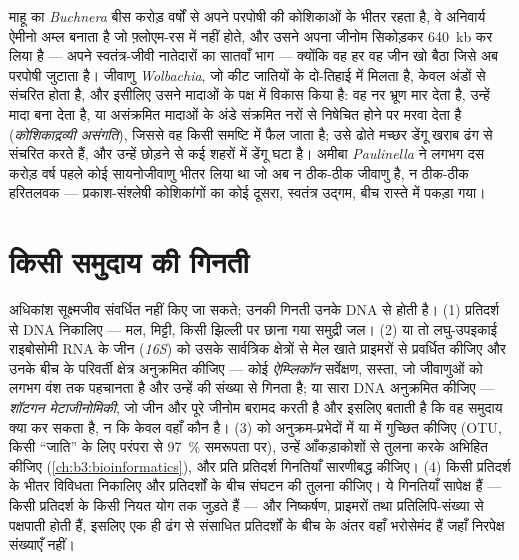 \begin{example}[तीन अनिवार्य साथी]\label{ex:b3:microbiomes:obligate}
माहू का \emph{Buchnera} बीस करोड़ वर्षों से अपने परपोषी की कोशिकाओं के
भीतर रहता है, वे अनिवार्य ऐमीनो अम्ल बनाता है जो फ़्लोएम-रस में नहीं
होते, और उसने अपना जीनोम सिकोड़कर \qty{640}{kb} कर लिया है --- अपने
स्वतंत्र-जीवी नातेदारों का सातवाँ भाग --- क्योंकि वह हर वह जीन खो
बैठा जिसे अब परपोषी जुटाता है। जीवाणु \emph{Wolbachia}, जो कीट जातियों
के दो-तिहाई में मिलता है, केवल अंडों से संचरित होता है, और इसीलिए उसने
मादाओं के पक्ष में विकास किया है: वह नर भ्रूण मार देता है, उन्हें मादा
बना देता है, या असंक्रमित मादाओं के अंडे संक्रमित नरों से निषेचित होने
पर मरवा देता है (\emph{कोशिकाद्रव्यी असंगति}), जिससे वह किसी समष्टि में
फैल जाता है; उसे ढोते मच्छर डेंगू खराब ढंग से संचरित करते हैं, और
उन्हें छोड़ने से कई शहरों में डेंगू घटा है। अमीबा \emph{Paulinella} ने
लगभग दस करोड़ वर्ष पहले कोई सायनोजीवाणु भीतर लिया था जो अब न ठीक-ठीक
जीवाणु है, न ठीक-ठीक हरितलवक --- प्रकाश-संश्लेषी कोशिकांगों का कोई
दूसरा, स्वतंत्र उद्गम, बीच रास्ते में पकड़ा गया।
\end{example}

\section{किसी समुदाय की गिनती}

\begin{method}[अनुक्रमण से किसी माइक्रोबायोम का लक्षण-चित्र]\label{met:b3:microbiomes:16s}
अधिकांश सूक्ष्मजीव संवर्धित नहीं किए जा सकते; उनकी गिनती उनके DNA से
होती है। (1) प्रतिदर्श से DNA निकालिए --- मल, मिट्टी, किसी झिल्ली पर
छाना गया समुद्री जल। (2) या तो लघु-उपइकाई राइबोसोमी RNA के जीन
(\emph{16S}) को उसके सार्वत्रिक क्षेत्रों से मेल खाते प्राइमरों से
प्रवर्धित कीजिए और उनके बीच के परिवर्ती क्षेत्र अनुक्रमित कीजिए ---
कोई \emph{ऐम्प्लिकॉन} सर्वेक्षण, सस्ता, जो जीवाणुओं को लगभग वंश तक
पहचानता है और उन्हें  की संख्या से गिनता है; या सारा DNA
अनुक्रमित कीजिए --- \emph{शॉटगन मेटाजीनोमिकी}, जो जीन और पूरे जीनोम
बरामद करती है और इसलिए बताती है कि वह समुदाय क्या कर सकता है, न कि
केवल वहाँ कौन है। (3)  को अनुक्रम-प्रभेदों में या
\emph{} में गुच्छित कीजिए (OTU, किसी
``जाति'' के लिए परंपरा से \qty{97}{\%} समरूपता पर), उन्हें आँकड़ाकोशों
से तुलना करके अभिहित कीजिए (\cref{ch:b3:bioinformatics}), और प्रति
प्रतिदर्श गिनतियाँ सारणीबद्ध कीजिए। (4) किसी प्रतिदर्श के भीतर विविधता
निकालिए और प्रतिदर्शों के बीच संघटन की तुलना कीजिए। ये गिनतियाँ सापेक्ष
हैं --- किसी प्रतिदर्श के  किसी नियत योग तक जुड़ते हैं --- और
निष्कर्षण, प्राइमरों तथा प्रतिलिपि-संख्या से पक्षपाती होती हैं, इसलिए
एक ही ढंग से संसाधित प्रतिदर्शों के बीच के अंतर वहाँ भरोसेमंद हैं जहाँ
निरपेक्ष संख्याएँ नहीं।
\end{method}

